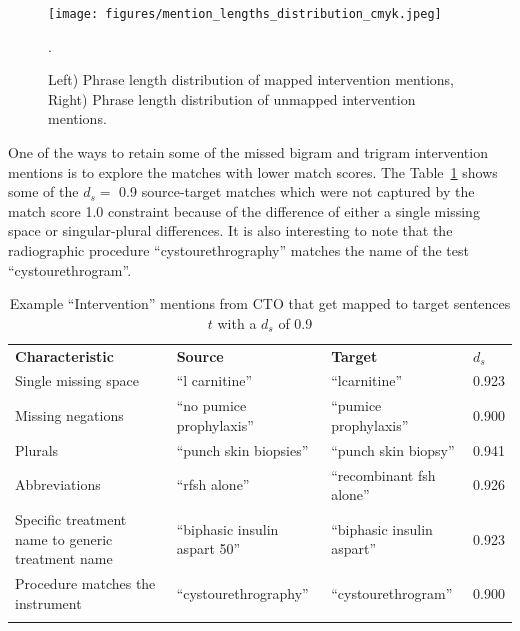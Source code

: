 \documentclass[11pt]{article}
\begin{document}
%
%
%
\begin{figure}[hbt!]
\centering
\texttt{[image: figures/mention\_lengths\_distribution\_cmyk.jpeg]}
\caption{Left) Phrase length distribution of mapped intervention mentions, Right) Phrase length distribution of unmapped intervention mentions.}.
\label{app:length_mappedunmapped}
\end{figure}
%
%
%
One of the ways to retain some of the missed bigram and trigram intervention mentions is to explore the matches with lower match scores.
The Table~\ref{table:conf9exp} shows some of the $d_s =$ 0.9 source-target matches which were not captured by the match score 1.0 constraint because of the difference of either a single missing space or singular-plural differences.
It is also interesting to note that the radiographic procedure ``cystourethrography'' matches the name of the test ``cystourethrogram''.
%
\begin{table}
\begin{center}
    \begin{tabular}{p{6cm}p{4cm}p{4cm}p{1cm}}
    \Xhline{1pt} \textbf{Characteristic} & \textbf{Source} & \textbf{Target} & \textbf{$d_s$} \\ \Xhline{1pt}
    Single missing space & ``l carnitine'' & ``lcarnitine'' & 0.923\\
    Missing negations & ``no pumice prophylaxis''&  ``pumice prophylaxis''  & 0.900\\
    Plurals & ``punch skin biopsies'' &  ``punch skin biopsy''  & 0.941\\
    Abbreviations & ``rfsh alone'' & ``recombinant fsh alone'' & 0.926\\
    Specific treatment name to generic treatment name & ``biphasic insulin aspart 50'' & ``biphasic insulin aspart'' & 0.923\\
    Procedure matches the instrument & ``cystourethrography'' & ``cystourethrogram'' & 0.900\\
    \Xhline{1pt}
    \end{tabular}
\end{center}
\caption{Example ``Intervention'' mentions from CTO that get mapped to target sentences $t$ with a $d_{s}$ of 0.9}
\label{table:conf9exp} 
\end{table} 
%
%
%
\end{document}
